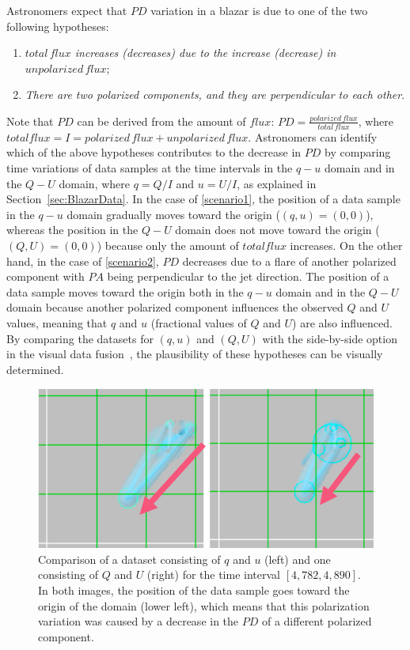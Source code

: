 Astronomers expect that $PD$ variation in a blazar is due to one of the two following hypotheses:
\begin{enumerate}[nosep, label=\textsl{Hypothesis \arabic*}:, ref=\textsl{Hypothesis \arabic*}, align=parleft, leftmargin=*]
    \item \textsl{$total\,flux$ increases (decreases) due to the increase (decrease) in $unpolarized\,flux$};  \label{scenario1}
    \item \textsl{There are two polarized components, and they are perpendicular to each other}. \label{scenario2}
\end{enumerate}
Note that $PD$ can be derived from the amount of $flux$: $PD = \frac{polarized\,flux}{total\,flux}$,
where $total flux = I = polarized\,flux + unpolarized\,flux$.
Astronomers can identify which of the above hypotheses contributes to the decrease in $PD$
by comparing time variations of data samples at the time intervals in the $q - u$ domain and in the $Q-U$ domain,
where $q = Q / I$ and $u = U / I$, as explained in Section~\ref{sec:BlazarData}.
In the case of \ref{scenario1}, the position of a data sample in the $q - u$ domain gradually moves toward the origin ($(q, u) = (0, 0)$),
whereas the position in the $Q-U$ domain does not move toward the origin ($(Q, U) = (0, 0)$)
because only the amount of $total flux$ increases.
On the other hand, in the case of \ref{scenario2}, 
$PD$ decreases due to a flare of another polarized component with $PA$ being perpendicular to the jet direction.
The position of a data sample moves toward the origin both in the $q - u$ domain and in the $Q - U$ domain 
because another polarized component influences the observed $Q$ and $U$ values, 
meaning that $q$ and $u$ (fractional values of $Q$ and $U$) are also influenced.
By comparing the datasets for $(q, u)$ and $(Q, U)$ with the side-by-side option in the visual data fusion~\cite{Fujishiro2018},
the plausibility of these hypotheses can be visually determined.
\begin{figure}[tb]
    \centering
    \includegraphics[width=.8\linewidth]{figures/stokesComparisonLabel.png}
    \caption{Comparison of a dataset consisting of $q$ and $u$ (left) and one consisting of $Q$ and $U$ (right) for the time interval $[4{,}782, 4{,}890]$.
    In both images, the position of the data sample goes toward the origin of the domain (lower left), which means that this polarization variation was caused by a decrease in the $PD$ of a different polarized component.}
    \label{fig:comparisonQIUIvsQU}
\end{figure}

